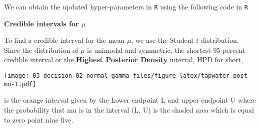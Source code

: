 \documentclass[]{book}
\newenvironment{Shaded}{\begin{snugshade}}{\end{snugshade}}
\newcommand{\KeywordTok}[1]{\textcolor[rgb]{0.13,0.29,0.53}{\textbf{#1}}}
\newcommand{\DecValTok}[1]{\textcolor[rgb]{0.00,0.00,0.81}{#1}}
\newcommand{\FloatTok}[1]{\textcolor[rgb]{0.00,0.00,0.81}{#1}}
\newcommand{\StringTok}[1]{\textcolor[rgb]{0.31,0.60,0.02}{#1}}
\newcommand{\CommentTok}[1]{\textcolor[rgb]{0.56,0.35,0.01}{\textit{#1}}}
\newcommand{\OperatorTok}[1]{\textcolor[rgb]{0.81,0.36,0.00}{\textbf{#1}}}
\newcommand{\NormalTok}[1]{#1}
\theoremstyle{definition}
\theoremstyle{definition}
\theoremstyle{remark}
\begin{document}
We can obtain the updated hyper-parameters in \texttt{R} using the
following code in \texttt{R}

\begin{Shaded}
\end{Shaded}

\textbf{Credible intervals for \(\mu\)}

To find a credible interval for the mean \(\mu\), we use the Student
\(t\) distribution. Since the distribution of \(\mu\) is unimodal and
symmetric, the shortest 95 percent credible interval or the
\textbf{Highest Posterior Density} interval, HPD for short,

\texttt{[image: 03-decision-02-normal-gamma\_files/figure-latex/tapwater-post-mu-1.pdf]}

is the orange interval given by the Lower endpoint L and upper endpoint
U where the probability that mu is in the interval (L, U) is the shaded
area which is equal to zero point nine five.
\end{document}
